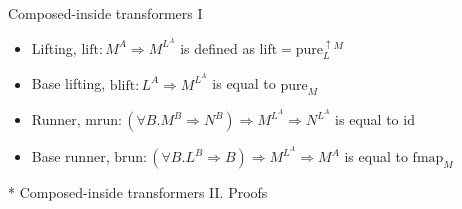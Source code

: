 \documentclass[english]{beamer}
\begin{document}
\begin{frame}{Composed-inside transformers I}
\begin{itemize}
\begin{itemize}
\item Lifting, $\text{lift}:M^{A}\Rightarrow M^{L^{A}}$ is defined as $\text{lift}=\text{pure}_{L}^{\uparrow M}$
\item Base lifting, $\text{blift}:L^{A}\Rightarrow M^{L^{A}}$ is equal
to $\text{pure}_{M}$
\item Runner, $\text{mrun}:\left(\forall B.M^{B}\Rightarrow N^{B}\right)\Rightarrow M^{L^{A}}\Rightarrow N^{L^{A}}$
is equal to $\text{id}$
\item Base runner, $\text{brun}:\left(\forall B.L^{B}\Rightarrow B\right)\Rightarrow M^{L^{A}}\Rightarrow M^{A}$
is equal to $\text{fmap}_{M}$
\end{itemize}
\end{itemize}
\end{frame}

\begin{frame}{{*} Composed-inside transformers II. Proofs}


\end{frame}
\end{document}
